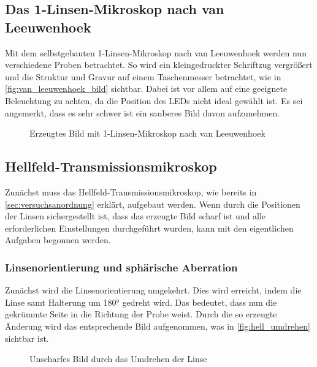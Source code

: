 \documentclass[12pt,english,ngerman]{scrartcl}
\begin{document}
\subsection{Das 1-Linsen-Mikroskop nach van Leeuwenhoek}

Mit dem selbstgebauten 1-Linsen-Mikroskop nach van Leeuwenhoek werden nun
verschiedene Proben betrachtet. So wird ein kleingedruckter Schriftzug
vergrößert und die Struktur und Gravur auf einem Taschenmesser betrachtet, wie
in \autoref{fig:van_leeuwenhoek_bild} sichtbar. Dabei ist vor allem auf eine
geeignete Beleuchtung zu achten, da die Position des LEDs nicht ideal gewählt
ist. Es sei angemerkt, dass es sehr schwer ist ein sauberes Bild davon
aufzunehmen.

\begin{figure}[H]
	\begin{center}
	\end{center}
	\caption[Erzeugtes Bild mit 1-Linsen-Mikroskop nach van Leeuwenhoek] { Erzeugtes Bild
		mit 1-Linsen-Mikroskop nach van Leeuwenhoek
	}\label{fig:van_leeuwenhoek_bild}
\end{figure}

\subsection{Hellfeld-Transmissionsmikroskop}

Zunächst muss das Hellfeld-Transmissionsmikroskop, wie bereits in
\autoref{sec:versuchsanordnung} erklärt, aufgebaut werden. Wenn durch die
Positionen der Linsen sichergestellt ist, dass das erzeugte Bild scharf ist und
alle erforderlichen Einstellungen durchgeführt wurden, kann mit den
eigentlichen Aufgaben begonnen werden.

\subsubsection{Linsenorientierung und sphärische Aberration}

Zunächst wird die Linsenorientierung umgekehrt. Dies wird erreicht, indem die
Linse samt Halterung um 180° gedreht wird. Das bedeutet, dass nun die gekrümmte
Seite in die Richtung der Probe weist. Durch die so erzeugte Änderung wird das
entsprechende Bild aufgenommen, was in \autoref{fig:hell_umdrehen} sichtbar
ist.

\begin{figure}[H]
	\begin{center}
	\end{center}
	\caption[Unscharfes Bild durch das Umdrehen der Linse] { Unscharfes Bild durch das
		Umdrehen der Linse
	}\label{fig:hell_umdrehen}
\end{figure}
\end{document}
